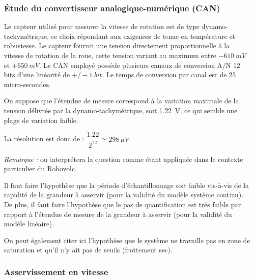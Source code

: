 \subsubsection{Étude du convertisseur analogique-numérique (CAN)}


\ifprof
\else
Le capteur utilisé pour mesurer la vitesse de rotation est de type dynamo-tachymétrique, ce choix
répondant aux exigences de tenue en température et robustesse. Le capteur fournit une tension
directement proportionnelle à la vitesse de rotation de la roue, cette tension variant au maximum
entre $-\SI{610}{mV}$ et $+\SI{650}{mV}$. Le CAN employé possède plusieurs canaux de conversion A/N 12 bits
d'une linéarité de $+/-\SI{1}{bit}$. Le temps de conversion par canal est de 25 micro-secondes.
\fi

\ifprof
\begin{corrige}
On suppose que l’étendue de mesure correspond à la variation maximale de la tension délivrée  
par la dynamo-tachymétrique, soit \SI{1,22}{V}, ce qui semble une plage de variation faible.

La résolution est donc de : $\dfrac{1.22}{2^{12}} \simeq \SI{298}{\mu V}$. 

\end{corrige}
\else
\fi

\ifprof
\begin{corrige}
\textit{Remarque :} on interprétera la question comme étant appliquée dans le contexte particulier du Robovolc.


Il faut faire l’hypothèse que la période d’échantillonnage soit faible vis-à-vis de la rapidité de la grandeur à asservir (pour la validité du modèle système continu). De plus, il faut faire l’hypothèse que le pas de quantification est très faible par rapport à l’étendue de mesure de la grandeur à asservir (pour la validité du modèle linéaire).

On peut également citer ici l’hypothèse que le système ne travaille pas en zone de saturation et qu’il n’y ait pas de seuils (frottement sec). 

\end{corrige}
\else
\fi

\subsubsection{Asservissement en vitesse}


